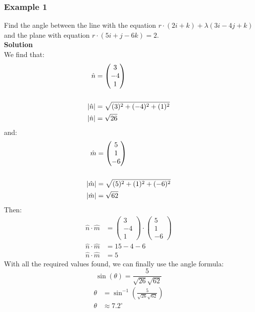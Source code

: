 \documentclass[hidelinks, a4paper, 12pt]{article}
\newcommand{\bd}{\textbf}
\newcommand{\nhat}{\hat{n}}
\newcommand{\mhat}{\hat{m}}
\newcommand{\n}{\\[\baselineskip]}
\begin{document}
            \subsubsection{Example 1}
                Find the angle between the line with the equation $r\cdot(2i+k) + \lambda(3i - 4j + k)$ and the plane with equation 
                $r\cdot(5i+j-6k) = 2$.\n
                \bd{Solution}\n
                We find that: 
                \[\begin{split}
                    \nhat &= \begin{pmatrix} 3 \\ -4 \\ 1 \end{pmatrix}\n
                    |\nhat| &= \sqrt{(3)^2 + (-4)^2 + (1)^2}\\
                    |\nhat| &= \sqrt{26}
                \end{split}\]
                and:
                \[\begin{split}
                    \mhat &= \begin{pmatrix} 5 \\ 1 \\ -6 \end{pmatrix}\n
                    |\mhat| &= \sqrt{(5)^2 + (1)^2 + (-6)^2}\\
                    |\mhat| &= \sqrt{62}
                \end{split}\]
                Then:
                \[\begin{split}
                    \nhat \cdot \mhat &= \begin{pmatrix} 3 \\ -4 \\ 1 \end{pmatrix} \cdot \begin{pmatrix} 5 \\ 1 \\ -6 \end{pmatrix}\\
                    \nhat \cdot \mhat &= 15 - 4 - 6\\
                    \nhat \cdot \mhat &= 5
                \end{split}\]
                With all the required values found, we can finally use the angle formula:
                \[\sin(\theta) = \frac{5}{\sqrt{26}\sqrt{62}}\]
                \[\begin{split}
                    \theta &= \sin^{-1}\left(\frac{5}{\sqrt{26}\sqrt{62}}\right)\\
                    \theta &\approx 7.2^{\circ}
                \end{split}\]
\end{document}

